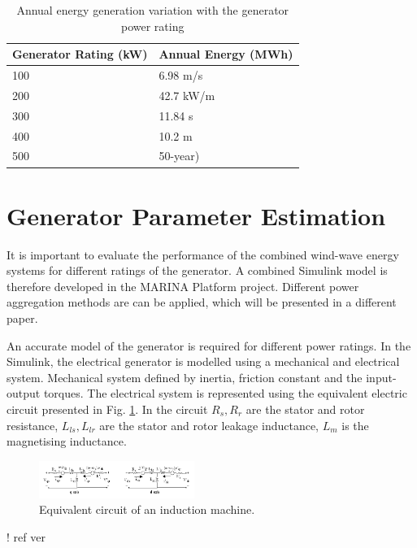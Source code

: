 \documentclass[twocolumn]{article}
\begin{document}
  \begin{table}
    \centering
    \begin{tabular}{ll}
     Generator Rating (kW) & Annual Energy (MWh) \\
    \hline
  100 & 6.98 m/s \\
  200 &  42.7 kW/m \\
  300 & 11.84 s \\
  400 & 10.2 m  \\
  500 & 50-year) \\
  \hline
    \end{tabular}
    \caption{Annual energy generation variation with the generator power rating}
    \label{generator_rating_table}
  \end{table}
  
\section{Generator Parameter Estimation}

It is important to evaluate the performance of the combined wind-wave energy systems for different ratings of the generator. A combined Simulink model is therefore developed in the MARINA Platform project. Different power aggregation methods are can be applied, which will be presented in a different paper.

An accurate model of the generator is required for different power ratings. In the Simulink, the electrical generator is modelled using a mechanical and electrical system. Mechanical system defined by inertia, friction constant and the input-output torques. The electrical system is represented using the equivalent electric circuit presented in Fig. \ref{equivalent_circuit}. In the circuit $R_s, R_r$ are the stator and rotor resistance, $L_{ls}, L_{lr}$ are the stator and rotor leakage inductance, $L_m$ is the magnetising inductance.


  \begin{figure}
    \centering
    \includegraphics[width=0.45\textwidth]{scig_schematic}
    \caption{Equivalent circuit of an induction machine.} 
    \label{equivalent_circuit}
  \end{figure}
  
  ! ref ver %
\end{document}
